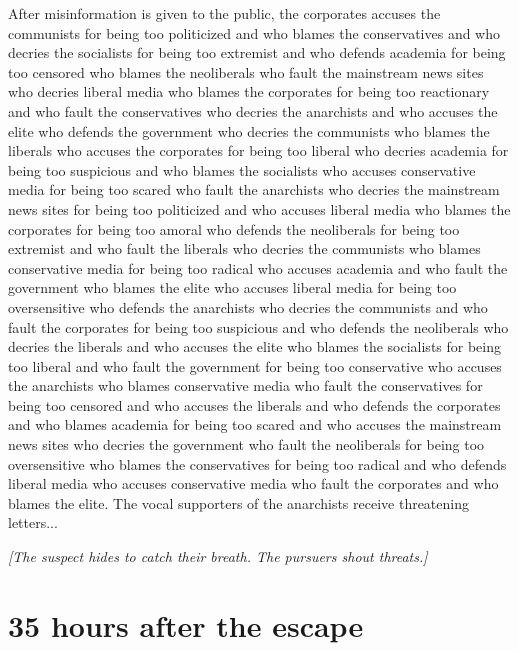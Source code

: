 \documentclass{report}
\begin{document}
After misinformation is given to the public, the corporates accuses the communists for being too politicized and who blames the conservatives and who decries the socialists for being too extremist and who defends academia for being too censored who blames the neoliberals who fault the mainstream news sites who decries liberal media who blames the corporates for being too reactionary and who fault the conservatives who decries the anarchists and who accuses the elite who defends the government who decries the communists who blames the liberals who accuses the corporates for being too liberal who decries academia for being too suspicious and who blames the socialists who accuses conservative media for being too scared who fault the anarchists who decries the mainstream news sites for being too politicized and who accuses liberal media who blames the corporates for being too amoral who defends the neoliberals for being too extremist and who fault the liberals who decries the communists who blames conservative media for being too radical who accuses academia and who fault the government who blames the elite who accuses liberal media for being too oversensitive who defends the anarchists who decries the communists and who fault the corporates for being too suspicious and who defends the neoliberals who decries the liberals and who accuses the elite who blames the socialists for being too liberal and who fault the government for being too conservative who accuses the anarchists who blames conservative media who fault the conservatives for being too censored and who accuses the liberals and who defends the corporates and who blames academia for being too scared and who accuses the mainstream news sites who decries the government who fault the neoliberals for being too oversensitive who blames the conservatives for being too radical and who defends liberal media who accuses conservative media who fault the corporates and who blames the elite. The vocal supporters of the anarchists receive threatening letters...

\textit{[The suspect hides to catch their breath. The pursuers shout threats.]}


\section*{35 \small{hours after the escape}}
\end{document}
